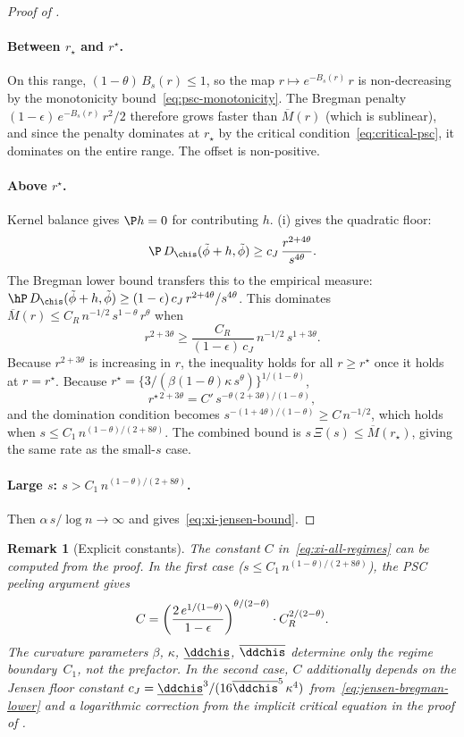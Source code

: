 \documentclass{article}
\newtheorem{remark}{Remark}[section]
\begin{document}
\begin{proof}[Proof of ]
\paragraph{Between $r_\star$ and $r^\star$.}
On this range, $(1-\theta)\, B_s(r) \le 1$,
so the map $r \mapsto e^{-B_s(r)}\, r$
is non-decreasing
by the monotonicity bound~\eqref{eq:psc-monotonicity}.
The Bregman penalty
$(1-\epsilon)\, e^{-B_s(r)}\, r^2/2$
therefore grows faster than $\overline{M}(r)$
(which is sublinear),
and since the penalty dominates at $r_\star$
by the critical condition~\eqref{eq:critical-psc},
it dominates on the entire range.
The offset is non-positive.

\paragraph{Above $r^\star$.}
Kernel balance gives $\P h = 0$
for contributing $h$.
(i)
gives the quadratic floor:
\[
\P\, D_{\chis}(\tilde\phi + h, \tilde\phi)
  \ge c_J\, \frac{r^{2+4\theta}}{s^{4\theta}}.
\]
The Bregman lower bound transfers this
to the empirical measure:
$\hP\, D_{\chis}(\tilde\phi + h, \tilde\phi)
  \ge (1-\epsilon)\, c_J\, r^{2+4\theta}/s^{4\theta}$.
This dominates
$\overline{M}(r) \le C_R\, n^{-1/2}\, s^{1-\theta}\, r^\theta$
when
\[
r^{2+3\theta}
  \ge \frac{C_R}{(1-\epsilon)\, c_J}\, n^{-1/2}\, s^{1+3\theta}.
\]
Because $r^{2+3\theta}$ is increasing in $r$,
the inequality holds for all $r \ge r^\star$
once it holds at $r = r^\star$.
Because $r^\star
  = \{3/(\beta(1-\theta)\kappa\, s^\theta)\}^{1/(1-\theta)}$,
\[
r^{\star\,2+3\theta}
  = C'\, s^{-\theta(2+3\theta)/(1-\theta)},
\]
and the domination condition becomes
$s^{-(1+4\theta)/(1-\theta)} \ge C\, n^{-1/2}$,
which holds when
$s \le C_1\, n^{(1-\theta)/(2+8\theta)}$.
The combined bound is
$s\,\Xi(s) \le \overline{M}(r_\star)$,
giving the same rate as the small-$s$ case.

\paragraph{Large $s$:
  $s > C_1\, n^{(1-\theta)/(2+8\theta)}$.}
Then $\alpha\, s / \log n \to \infty$
and 
gives~\eqref{eq:xi-jensen-bound}.
\end{proof}

\begin{remark}[Explicit constants]
\label{rmk:explicit-constants}
The constant $C$ in~\eqref{eq:xi-all-regimes}
can be computed from the proof.
In the first case
($s \le C_1\, n^{(1-\theta)/(2+8\theta)}$),
the PSC peeling argument gives
\[
C = \qty(\frac{2\, e^{1/(1-\theta)}}{1-\epsilon})^{\theta/(2-\theta)}
  \cdot C_R^{2/(2-\theta)}.
\]
The curvature parameters
$\beta$, $\kappa$, $\underline{\ddchis}$, $\overline{\ddchis}$
determine only the regime boundary~$C_1$,
not the prefactor.
In the second case,
$C$ additionally depends on the Jensen floor constant
$c_J = \underline{\ddchis}^3
  / (16\overline{\ddchis}^5\, \kappa^4)$
from~\eqref{eq:jensen-bregman-lower}
and a logarithmic correction
from the implicit critical equation
in the proof of .
\end{remark}
\end{document}
